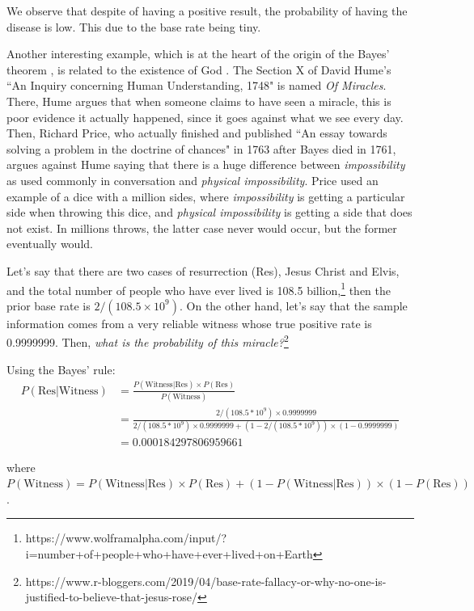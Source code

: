 We observe that despite of having a positive result, the probability of having the disease is low. This due to the base rate being tiny.

Another interesting example, which is at the heart of the origin of the Bayes' theorem \cite{bayes1763lii}, is related to the existence of God \cite{stigler2018richard}. The Section X of David Hume's ``An Inquiry concerning Human Understanding, 1748" is named \textit{Of Miracles}. There, Hume argues that when someone claims to have seen a miracle, this is poor evidence it actually happened, since it goes against what we see every day. Then, Richard Price, who actually finished and published ``An essay towards solving a problem in the doctrine of chances" in 1763 after Bayes died in 1761, argues against Hume saying that there is a huge difference between \textit{impossibility} as used commonly in conversation and \textit{physical impossibility}. Price used an example of a dice with a million sides, where \textit{impossibility} is getting a particular side when throwing this dice, and \textit{physical impossibility} is getting a side that does not exist. In millions throws, the latter case never would occur, but the former eventually would.

Let's say that there are two cases of resurrection (Res), Jesus Christ and Elvis, and the total number of people who have ever lived is 108.5 billion,\footnote{https://www.wolframalpha.com/input/?i=number+of+people+who+have+ever+lived+on+Earth} then the prior base rate is $2/(108.5\times 10^{9})$. On the other hand, let's say that the sample information comes from a very reliable witness whose true positive rate is  0.9999999. Then, \textit{what is the probability of this miracle?}\footnote{https://www.r-bloggers.com/2019/04/base-rate-fallacy-or-why-no-one-is-justified-to-believe-that-jesus-rose/}

Using the Bayes' rule:
{\small{
\begin{align*}
	P(\text{Res}|\text{Witness}) & =  \frac{P(\text{Witness}|\text{Res})\times P(\text{Res})}{P(\text{Witness})}\\
	& =\frac{2/(108.5 * 10^9) \times 0.9999999}{2/(108.5 * 10^9) \times 0.9999999 + (1-2/(108.5 * 10^9)) \times (1-0.9999999)}\\
	& = 0.000184297806959661
\end{align*}
}}

where $P(\text{Witness})=P(\text{Witness}|\text{Res})\times P(\text{Res})+(1-P(\text{Witness}|\text{Res}))\times (1-P(\text{Res}))$.

